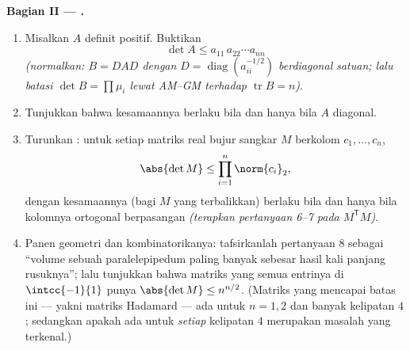 \begin{problem}
\medskip
\noindent\textbf{Bagian II --- .}
\begin{enumerate}[resume]
  \item Misalkan $A$ definit positif. Buktikan
        \[
        \det A \leq a_{11}\,a_{22}\cdots a_{nn}
        \]
        \emph{(normalkan: $B = DAD$ dengan $D =
        \operatorname{diag}(a_{ii}^{-1/2})$ berdiagonal satuan;
        lalu batasi $\det B = \prod \mu_i$ lewat AM--GM terhadap
        $\operatorname{tr} B = n$)}.
  \item Tunjukkan bahwa kesamaannya berlaku bila dan hanya bila $A$ diagonal.
  \item Turunkan \emph{}: untuk setiap matriks
        real bujur sangkar $M$ berkolom $c_1, \dots, c_n$,
        \[
        \abs{\det M} \leq \prod_{i=1}^{n}\norm{c_i}_2 ,
        \]
        dengan kesamaannya (bagi $M$ yang terbalikkan) berlaku bila dan
        hanya bila kolomnya ortogonal berpasangan \emph{(terapkan
        pertanyaan 6--7 pada $M^{\mathsf T}M$)}.
  \item Panen geometri dan kombinatorikanya: tafsirkanlah
        pertanyaan 8 sebagai ``volume sebuah paralelepipedum paling
        banyak sebesar hasil kali panjang rusuknya''; lalu tunjukkan bahwa
        matriks yang semua entrinya di $\intcc{-1}{1}$ punya
        $\abs{\det M} \leq n^{n/2}$. (Matriks yang mencapai batas
        ini --- yakni matriks Hadamard --- ada untuk $n = 1, 2$
        dan banyak kelipatan $4$; sedangkan apakah ada untuk \emph{setiap}
        kelipatan $4$ merupakan masalah  yang terkenal.)
\end{enumerate}


\end{problem}
